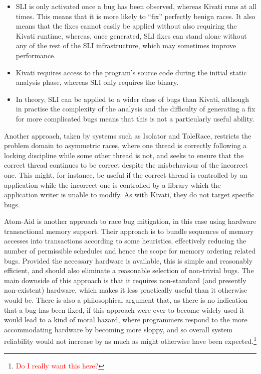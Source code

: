 \documentclass[10pt,twocolumn,preprint,natbib,authoryear]{sigplanconf}
\newcommand{\editorial}[1]{\textcolor{red}{\footnote{\textcolor{red}{#1}}}}
\begin{document}
\begin{itemize}
\item SLI is only activated once a bug has been observed, whereas
  Kivati runs at all times.  This means that it is more likely to
  ``fix'' perfectly benign races.  It also means that the fixes cannot
  easily be applied without also requiring the Kivati runtime,
  whereas, once generated, SLI fixes can stand alone without any of
  the rest of the SLI infrastructure, which may sometimes improve
  performance.

\item Kivati requires access to the program's source code during the
  initial static analysis phase, whereas SLI only requires the binary.

\item In theory, SLI can be applied to a wider class of bugs than
  Kivati, although in practise the complexity of the analysis and the
  difficulty of generating a fix for more complicated bugs means that
  this is not a particularly useful ability.
\end{itemize}

Another approach, taken by systems such as
Isolator\cite{Ramalingam2009} and ToleRace\cite{Kirovski2007},
restricts the problem domain to asymmetric races, where one thread is
correctly following a locking discipline while some other thread is
not, and seeks to ensure that the correct thread continues to be
correct despite the misbehaviour of the incorrect one.  This might,
for instance, be useful if the correct thread is controlled by an
application while the incorrect one is controlled by a library which
the application writer is unable to modify.  As with Kivati, they do
not target specific bugs.

Atom-Aid\cite{Lucia2009} is another approach to race bug
mitigation, in this case using hardware transactional memory support.
Their approach is to bundle sequences of memory accesses into
transactions according to some heuristics, effectively reducing the
number of permissible schedules and hence the scope for memory
ordering related bugs.  Provided the necessary hardware is available,
this is simple and reasonably efficient, and should also eliminate a
reasonable selection of non-trivial bugs.  The main downside of this
approach is that it requires non-standard (and presently non-existent)
hardware, which makes it less practically useful than it otherwise
would be.  There is also a philosophical argument that, as there is no
indication that a bug has been fixed, if this approach were ever to
become widely used it would lead to a kind of moral hazard, where
programmers respond to the more accommodating hardware by becoming
more sloppy, and so overall system reliability would not increase by
as much as might otherwise have been expected.\editorial{Do I really
  want this here?}
\end{document}
